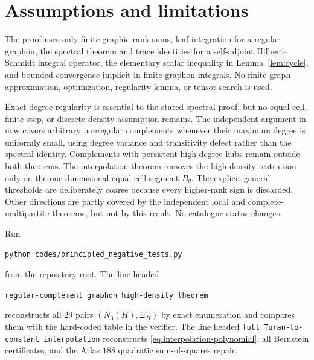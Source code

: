\documentclass[11pt]{article}
\begin{document}
\section{Assumptions and limitations}

The proof uses only finite graphic-rank sums, leaf integration for a regular
graphon, the spectral theorem and trace identities for a self-adjoint
Hilbert--Schmidt integral operator, the elementary scalar inequality in
Lemma~\ref{lem:cycle}, and bounded convergence implicit in finite graphon
integrals.  No finite-graph approximation, optimization, regularity lemma,
or tensor search is used.

Exact degree regularity is essential to the stated spectral proof, but
no equal-cell, finite-step, or discrete-density assumption remains.  The
independent argument in
 now covers
arbitrary nonregular complements whenever their maximum degree is uniformly
small, using degree variance and transitivity defect rather than the spectral
identity.  Complements with persistent high-degree hubs remain outside both
theorems.  The interpolation theorem removes the
high-density restriction only on the one-dimensional equal-cell segment
$B_\theta$.  The explicit general thresholds are deliberately coarse
because every higher-rank sign is discarded.  Other directions are partly
covered by the independent local and complete-multipartite theorems, but not
by this result.  No catalogue status changes.

Run
\begin{verbatim}
python codes/principled_negative_tests.py
\end{verbatim}
from the repository root.  The line headed
\begin{center}
\texttt{regular-complement graphon high-density theorem}
\end{center}
reconstructs all $29$ pairs $(N_3(H),\Xi_H)$ by exact enumeration and
compares them with the hard-coded table in the verifier.  The line headed
\texttt{full Turan-to-constant interpolation} reconstructs
\eqref{eq:interpolation-polynomial}, all Bernstein certificates, and the
Atlas $188$ quadratic sum-of-squares repair.
\end{document}
